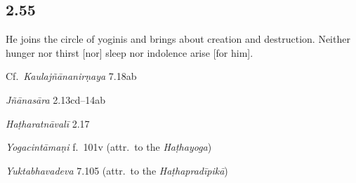\begin{ekdosis}
\begin{philcomm}[hp02_054]
\end{philcomm}

\subsection*{2.55}
\begin{translation}[hp02_055]
He joins the circle of yoginis and brings about creation and destruction. Neither hunger nor thirst [nor] sleep nor indolence arise [for him].
\end{translation}

\begin{sources}[hp02_055]
Cf.~\emph{Kaulajñānanirṇaya} 7.18ab

\begin{versinnote}
\end{versinnote}

\emph{Jñānasāra} 2.13cd–14ab

\begin{versinnote}
\end{versinnote}
\end{sources}

\begin{testimonia}[hp02_055]
\emph{Haṭharatnāvalī} 2.17

\begin{versinnote}
\end{versinnote}

\emph{Yogacintāmaṇi} f.~101v (attr.~to the \emph{Haṭhayoga})

\begin{versinnote}
\end{versinnote}

\emph{Yuktabhavadeva} 7.105 (attr.~to the \emph{Haṭhapradīpikā})

\begin{versinnote}
\end{versinnote}
\end{testimonia}


\end{ekdosis}
